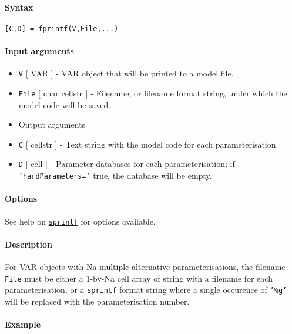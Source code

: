 


	\paragraph{Syntax}

\begin{verbatim}
[C,D] = fprintf(V,File,...)
\end{verbatim}

\paragraph{Input arguments}

\begin{itemize}
\item
  \texttt{V} {[} VAR {]} - VAR object that will be printed to a model
  file.
\item
  \texttt{File} {[} char \textbar{} cellstr {]} - Filename, or filename
  format string, under which the model code will be saved.
\item
  Output arguments
\item
  \texttt{C} {[} cellstr {]} - Text string with the model code for each
  parameterisation.
\item
  \texttt{D} {[} cell {]} - Parameter databases for each
  parameterisation; if \texttt{'hardParameters='} true, the database
  will be empty.
\end{itemize}

\paragraph{Options}

See help on \href{VAR/sprintf}{\texttt{sprintf}} for options available.

\paragraph{Description}

For VAR objects with Na multiple alternative parameterisations, the
filename \texttt{File} must be either a 1-by-Na cell array of string
with a filename for each parameterisation, or a \texttt{sprintf} format
string where a single occurence of \texttt{'\%g'} will be replaced with
the parameterisation number.

\paragraph{Example}


